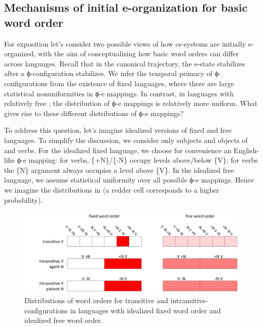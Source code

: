 \subsection{Mechanisms of initial e-organization for basic word order}

For exposition let's consider two possible views of how cs-systems are initially e-organized, with the aim of conceptualizing how basic word orders can differ across languages. Recall that in the canonical trajectory, the e-state stabilizes after a ϕ-configuration stabilizes. We infer the temporal primacy of ϕ-configurations from the existence of fixed  languages, where there are large statistical nonuniformities in ϕ-e mappings. In contrast, in languages with relatively free , the distribution of ϕ-e mappings is relatively more uniform. What gives rise to these different distributions of ϕ-e mappings?

  To address this question, let's imagine idealized versions of fixed and free  languages. To simplify the discussion, we consider only subjects and objects of  and  verbs. For the idealized fixed  language, we choose for convenience an English-like ϕ-e mapping: for  verbs, \{+N\}/\{-N\} occupy levels above/below \{V\}; for  verbs the \{N\} argument always occupies a level above \{V\}. In the idealized free  language, we assume statistical uniformity over all possible ϕ-e mappings. Hence we imagine the distributions in {} (a redder cell corresponds to a higher probability).

  
\begin{figure}
\includegraphics[width=\textwidth]{figures/Tilsen-img74.png}
\caption{Distributions of word orders for transitive and intransitive-configurations in languages with idealized fixed word order and idealized free word order.}
\label{fig:4:24}
\end{figure}
 

